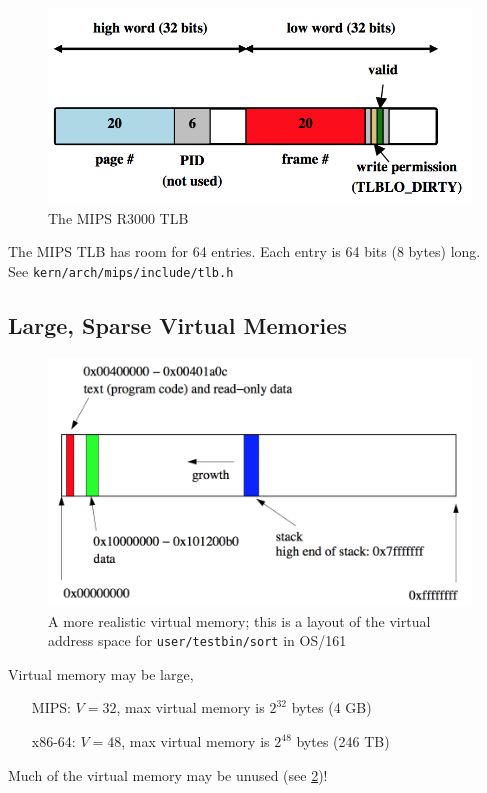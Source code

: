 \documentclass[12pt]{article}
\theoremstyle{plain}
\theoremstyle{definition}
\begin{document}
\begin{figure}[ht]
  \centering
  \includegraphics[scale=0.6]{pictures/mips_tlb.png}
  \caption{The MIPS R3000 TLB}
  \label{fig:mips_tlb}
\end{figure}
The MIPS TLB has room for 64 entries. Each entry is 64 bits (8 bytes) long. \\
See \texttt{kern/arch/mips/include/tlb.h}

\subsection{Large, Sparse Virtual Memories}
\begin{figure}[ht]
  \centering
  \includegraphics[scale=0.65]{pictures/real_v_mem.png}
  \caption{A more realistic virtual memory; this is a layout of the virtual address space for \texttt{user/testbin/sort} in OS/161}
  \label{fig:realistic_v_mem}
\end{figure}
Virtual memory may be large,
\begin{itemize}
  \item[MIPS:] $V = 32$, max virtual memory is $2^{32}$ bytes (4 GB)
  \item[x86-64:] $V = 48$, max virtual memory is $2^{48}$ bytes (246 TB)
\end{itemize}
Much of the virtual memory may be unused (see \ref{fig:realistic_v_mem})! \\
\end{document}

